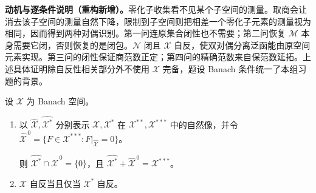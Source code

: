\documentclass[../../main.tex]{subfiles}
\begin{document}
\begin{remark}
\textbf{动机与逐条件说明（重构新增）。}零化子收集看不见某个子空间的测量。取商会让消去该子空间的测量自然下降，限制到子空间则把相差一个零化子元素的测量视为相同，因而得到两种对偶识别。第一问连原集合闭性也不需要；第二问恢复 $\mathcal M$ 本身需要它闭，否则恢复的是闭包。$\mathcal N$ 闭且 $\mathcal X$ 自反，使双对偶分离泛函能由原空间元素实现。第三问的闭性保证商范数正定；第四问的精确范数来自保范数延拓。上述具体证明除自反性相关部分外不使用 $\mathcal X$ 完备，题设 Banach 条件统一了本组习题的背景。
\end{remark}
\begin{exercise}\label{exercise:ch05-reflexive-dual}
设 $\mathcal X$ 为 Banach 空间。
\begin{enumerate}
\item\label{item:ch05-triple-dual-splitting}
\begin{definition*}[本题的自然像及其零化子]\label{definition:ch05-triple-dual-annihilator}
以 $\widehat{\mathcal X},\widehat{\mathcal X^*}$ 分别表示 $\mathcal X,\mathcal X^*$ 在 $\mathcal X^{**},\mathcal X^{***}$ 中的自然像，并令 $\widehat{\mathcal X}^{\,0}=\{F\in\mathcal X^{***}:F|_{\widehat{\mathcal X}}=0\}$。
\end{definition*}
则 $\widehat{\mathcal X^*}\cap\widehat{\mathcal X}^{\,0}=\{0\}$，且 $\widehat{\mathcal X^*}+\widehat{\mathcal X}^{\,0}=\mathcal X^{***}$。
\item\label{item:ch05-reflexive-iff-dual} $\mathcal X$ 自反当且仅当 $\mathcal X^*$ 自反。
\end{enumerate}
\end{exercise}
\end{document}
